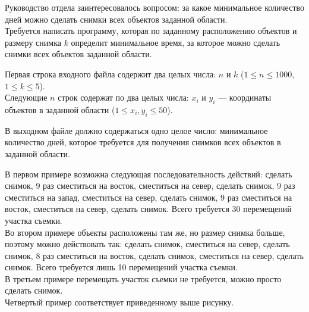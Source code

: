 \begin{problem}
Руководство отдела заинтересовалось вопросом: за какое минимальное количество дней можно сделать снимки всех объектов заданной области.\\

Требуется написать программу, которая по заданному расположению объектов и размеру снимка $k$ определит минимальное время, за которое можно сделать снимки всех объектов заданной области.

\InputFile

Первая строка входного файла содержит два целых числа: $n$ и $k$ ($1 \le n \le 1000$, $1 \le k \le 5$).\\

Следующие $n$ строк содержат по два целых числа: $x_i$ и $y_i$ — координаты объектов в заданной области ($1 \le x_i, y_i \le 50$).

\OutputFile

В выходном файле должно содержаться одно целое число: минимальное количество дней, которое требуется для получения снимков всех объектов в заданной области.

\Examples

\begin{example}
%
%
%
%
\end{example}

\Explanations

В первом примере возможна следующая последовательность действий: сделать снимок, 9 раз сместиться на восток, сместиться на север, сделать снимок, 9 раз сместиться на запад, сместиться на север, сделать снимок, 9 раз сместиться на восток, сместиться на север, сделать снимок. Всего требуется 30 перемещений участка съемки.\\

Во втором примере объекты расположены там же, но размер снимка больше, поэтому можно действовать так: сделать снимок, сместиться на север, сделать снимок, 8 раз сместиться на восток, сделать снимок, сместиться на север, сделать снимок. Всего требуется лишь 10 перемещений участка съемки.\\

В третьем примере перемещать участок съемки не требуется, можно просто сделать снимок.\\

Четвертый пример соответствует приведенному выше рисунку.

\end{problem}